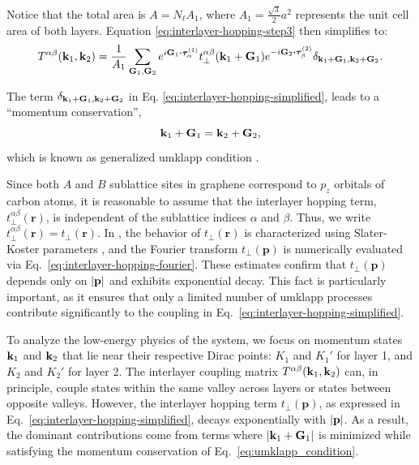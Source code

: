 Notice that the total area is \(A = N_\ell A_1\), where \(A_1 = \frac{\sqrt{3}}{2} a^2\) represents the unit cell area of both layers. Equation \ref{eq:interlayer-hopping-step3} then simplifies to:
\begin{equation} \label{eq:interlayer-hopping-simplified}
T^{\alpha\beta}(\k_1,\k_2) = \frac{1}{A_1} \sum_{\G_1, \G_2}
e^{i \G_1 \vdot \vtau_\alpha^{(1)}} t_\perp^{\alpha\beta}(\k_1+\G_1) e^{-i \G_2\vdot\vtau_\beta^{(2)}}
\delta_{\k_1+\G_1, \k_2+\G_2}.
\end{equation}

The term $\delta_{{\vb{k}}_1+{\vb{G}}_1, {\vb{k}}_2+{\vb{G}}_2}$ in Eq. \eqref{eq:interlayer-hopping-simplified}, leads to a ``momentum conservation'',
\begin{equation} \label{eq:umklapp_condition}
{\vb{k}}_1 + {\vb{G}}_1 = {\vb{k}}_2 + {\vb{G}}_2,
\end{equation}
which is known as generalized umklapp condition \cite{handbook2019}.


Since both \( A \) and \( B \) sublattice sites in graphene correspond to \( p_z \) orbitals of carbon atoms, it is reasonable to assume that the interlayer hopping term, \( t_\perp^{\alpha\beta}(\mathbf{r}) \), is independent of the sublattice indices \( \alpha \) and \( \beta \). Thus, we write \( t_\perp^{\alpha\beta}(\mathbf{r}) = t_\perp(\mathbf{r}) \). In \cite{macdonald2011}, the behavior of \( t_\perp(\mathbf{r}) \) is characterized using Slater-Koster parameters \cite{tperp-laissardiere2012}, and the Fourier transform \( t_\perp(\mathbf{p}) \) is numerically evaluated via Eq.~\eqref{eq:interlayer-hopping-fourier}. These estimates confirm that \( t_\perp(\mathbf{p}) \) depends only on \( \abs{\mathbf{p}} \) and exhibits exponential decay. This fact is particularly important, as it ensures that only a limited number of umklapp processes contribute significantly to the coupling in Eq.~\eqref{eq:interlayer-hopping-simplified}.

To analyze the low-energy physics of the system, we focus on momentum states \({\vb{k}}_1\) and \({\vb{k}}_2\) that lie near their respective Dirac points: \(K_1\) and \(K_1'\) for layer 1, and \(K_2\) and \(K_2'\) for layer 2. The interlayer coupling matrix \(T^{\alpha\beta}({\vb{k}}_1, {\vb{k}}_2)\) can, in principle, couple states within the same valley across layers or states between opposite valleys. However, the interlayer hopping term \(t_\perp(\mathbf{p})\), as expressed in Eq.~\eqref{eq:interlayer-hopping-simplified}, decays exponentially with \(\abs{\mathbf{p}}\). As a result, the dominant contributions come from terms where \(\abs{{\vb{k}}_1 + {\vb{G}}_1}\) is minimized while satisfying the momentum conservation of Eq.~\eqref{eq:umklapp_condition}.

